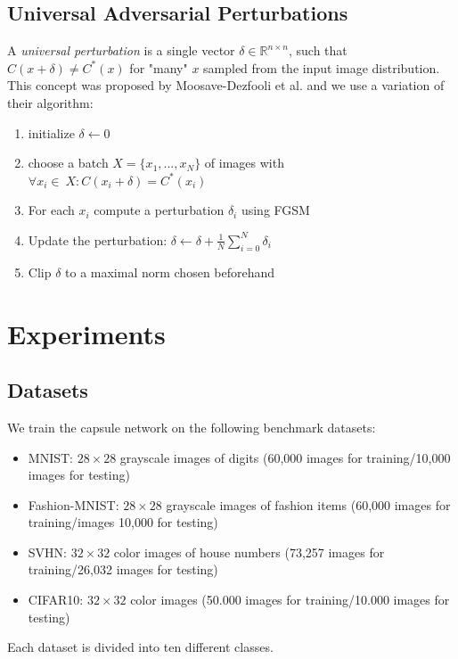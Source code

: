 \documentclass{article}
\begin{document}
\subsection{Universal Adversarial Perturbations}
A \emph{universal perturbation} is a single vector $\delta \in \mathbb{R}^{n\times n}$, such that $C(x + \delta) \neq C^*(x)$ for "many" $x$ sampled from the input image distribution.
This concept was proposed by Moosave-Dezfooli et al. \cite{universal} and we use a variation of their algorithm:
\begin{enumerate}
	\item initialize $\delta \gets 0$
	\item choose a batch $X = \{x_1, ..., x_N\}$ of images with $\forall x_i \in\ X:  C(x_i + \delta) = C^*(x_i)$
	\item For each $x_i$ compute a perturbation $\delta_i$ using FGSM \cite{fgsm}
	\item Update the perturbation: $\delta \gets \delta + \frac{1}{N} \sum\limits_{i=0}^N \delta_i$
	\item Clip $\delta$ to a maximal norm chosen beforehand
\end{enumerate}


\section{Experiments}
\label{lab:experiments}

\subsection{Datasets}

We train the capsule network on the following benchmark datasets:
\begin{itemize}
	\item MNIST: $28\times28$ grayscale images of digits (60,000  images for training/10,000  images for testing) \cite{mnist}
	\item Fashion-MNIST:  $28\times28$ grayscale images of fashion items (60,000 images for training/images 10,000 for testing) \cite{fashion}
	\item SVHN: $32\times32$ color images of house numbers (73,257  images for training/26,032  images for testing) \cite{svhn}
	\item CIFAR10: $32\times32$ color images (50.000  images for training/10.000  images for testing) \cite{cifar}
\end{itemize}
Each dataset is divided into ten different classes.
\end{document}
